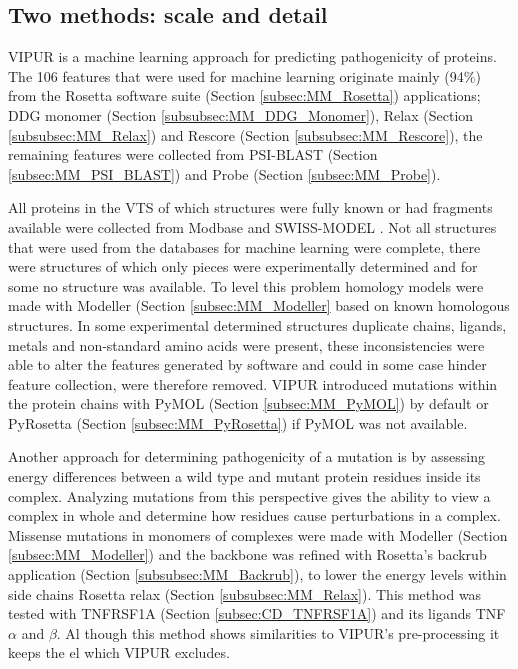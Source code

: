 \subsection{Two methods: scale and detail}

VIPUR is a machine learning approach for predicting pathogenicity of proteins. The 106 features that were used for machine learning originate mainly (94\%) from the Rosetta software suite (Section \ref{subsec:MM_Rosetta}) applications; DDG monomer (Section \ref{subsubsec:MM_DDG_Monomer}), Relax (Section \ref{subsubsec:MM_Relax}) and Rescore (Section \ref{subsubsec:MM_Rescore}), the remaining features were collected from PSI-BLAST (Section \ref{subsec:MM_PSI_BLAST}) and Probe (Section \ref{subsec:MM_Probe}). 

All proteins in the VTS of which structures were fully known or had fragments available were collected from Modbase \cite{} and
SWISS-MODEL \cite{}.
Not all structures that were used from the databases for machine learning were complete, there were structures of which only pieces were experimentally determined and for some no structure was available. To level this problem homology models were made with Modeller (Section \ref{subsec:MM_Modeller} based on known homologous structures. In some experimental determined structures duplicate chains, ligands, metals and non-standard amino acids were present, these inconsistencies were able to alter the features generated by software and could in some case hinder feature collection, were therefore removed. VIPUR introduced mutations within the protein chains with PyMOL (Section \ref{subsec:MM_PyMOL}) by default or PyRosetta (Section \ref{subsec:MM_PyRosetta}) if PyMOL was not available.

Another approach for determining pathogenicity of a mutation is by assessing energy differences between a wild type and mutant protein residues inside its complex. Analyzing mutations from this perspective gives the ability to view a complex in whole and determine how residues cause perturbations in a complex. Missense mutations in monomers of complexes were made with Modeller (Section \ref{subsec:MM_Modeller}) and the backbone was refined with Rosetta's backrub application (Section \ref{subsubsec:MM_Backrub}), to lower the energy levels within side chains Rosetta relax (Section \ref{subsubsec:MM_Relax}). This method was tested with TNFRSF1A (Section \ref{subsec:CD_TNFRSF1A}) and its ligands TNF $\alpha$ and $\beta$. Al though this method shows similarities to VIPUR's pre-processing it keeps the el which VIPUR excludes. 

